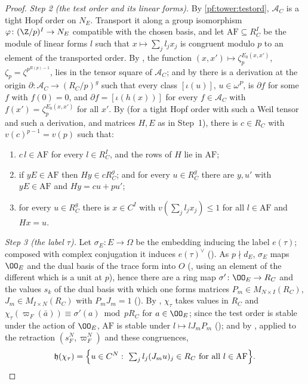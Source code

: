 \begin{proof}
\emph{Step 2 (the test order and its linear forms).} By \cref{pf:tower:testord}, $\mathcal A_C$ is a tight Hopf order on $N_E$.
Transport it along a group isomorphism $\varphi\colon(\Z/p)^I\to N_E$ compatible with the chosen basis, and let
$\mathrm{AF}\subseteq R_C^I$ be the module of linear forms $l$ such that $x\mapsto\sum_jl_jx_j$ is congruent modulo $p$ to an
element of the transported order. By , the function
$(x,x')\mapsto\zeta_p^{E_0(x,x')}$, $\zeta_p=\zeta^{p^{R(p)-1}}$, lies in the tensor square of $\mathcal A_C$; and by
 there is a derivation at the origin $\partial\colon
\mathcal A_C\to(R_C/p)^g$ such that every class $[\iota(u)]$, $u\in\omega^P$, is $\partial f$ for some $f$ with $f(0)=0$, and
$\partial f=[\iota(h(x))]$ for every $f\in\mathcal A_C$ with $f(x')=\zeta_p^{E_0(x,x')}$ for all $x'$. By
 (for a tight Hopf order with such a Weil tensor and such a derivation, and
matrices $H,E$ as in Step~1), there is $c\in R_C$ with $v(c)^{p-1}=v(p)$ such that:
\begin{enumerate}[label=(\alph*)]
\item\label{pf:tower:rl-a} $c\,l\in\mathrm{AF}$ for every $l\in R_C^I$, and the rows of $H$ lie in $\mathrm{AF}$;
\item\label{pf:tower:rl-b} if $yE\in\mathrm{AF}$ then $Hy\in cR_C^g$; and for every $u\in R_C^g$ there are $y,u'$ with
  $yE\in\mathrm{AF}$ and $Hy=cu+pu'$;
\item\label{pf:tower:rl-c} for every $u\in R_C^g$ there is $x\in C^I$ with $v(\sum_jl_jx_j)\le1$ for all $l\in\mathrm{AF}$ and
  $Hx=u$.
\end{enumerate}

\emph{Step 3 (the label $\tau$).} Let $\sigma_E\colon E\to\Omega$ be the embedding inducing the label $e(\tau)$; composed
with complex conjugation it induces $e(\tau)^\vee$ (). As
$p\nmid d_E$, $\sigma_E$ maps $\OO_E$ and the dual basis of the trace form into $O$
(, using an element of the different which is a unit at $p$), hence
there are a ring map $\sigma'\colon\OO_E\to R_C$ and the values $s_k$ of the dual basis with which one forms matrices
$P_m\in M_{N\times I}(R_C)$, $J_m\in M_{I\times N}(R_C)$ with $P_mJ_m=1$ ().
By , $\chi_\tau$ takes values in $R_C$ and
$\chi_\tau(\varpi_F(\bar a))\equiv\sigma'(a)\bmod pR_C$ for $a\in\OO_E$; since the test order is stable under the action of
$\OO_E$, $\mathrm{AF}$ is stable under $l\mapsto lJ_mP_m$ (); and by
, applied to the retraction $(s_F^N,\varpi_F^N)$ and these
congruences,
\begin{equation}\label{pf:tower:eq-hhAF}
\mathfrak h(\chi_\tau)=\Bigl\{u\in C^N:\ \textstyle\sum_jl_j(J_mu)_j\in R_C\ \text{for all }l\in\mathrm{AF}\Bigr\}.
\end{equation}


\end{proof}
